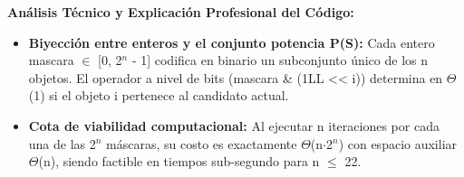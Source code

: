 \documentclass[11pt,letterpaper]{article}
\begin{document}
\noindent\textbf{\color{ipnguinda}Análisis Técnico y Explicación Profesional del Código:}\par\vspace{-2pt}
\begin{itemize}
\setlength{\itemsep}{2pt}\setlength{\parskip}{0pt}
  \item \textbf{Biyección entre enteros y el conjunto potencia P(S): }Cada entero mascara $\in$ [0, 2$^n$ - 1] codifica en binario un subconjunto único de los n objetos. El operador a nivel de bits (mascara \& (1LL << i)) determina en $\Theta$(1) si el objeto i pertenece al candidato actual.
  \item \textbf{Cota de viabilidad computacional: }Al ejecutar n iteraciones por cada una de las 2$^n$ máscaras, su costo es exactamente $\Theta$(n$\cdot$2$^n$) con espacio auxiliar $\Theta$(n), siendo factible en tiempos sub-segundo para n $\le$ 22.
\end{itemize}
\end{document}
